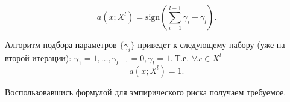 \begin{equation*}
	\displaystyle a(x; X^l) =  \text{sign} ( \sum\limits_{i=1}^{l-1} \gamma_i - \gamma_l).
\end{equation*}

 Алгоритм подбора параметров $\{\gamma_i\}$ приведет к следующему набору (уже на второй итерации): $\gamma_1=1, \dots, \gamma_{l-1}=0, \gamma_l=1$. Т.е. $\forall x \in X^l$ 
\begin{equation*}
	\displaystyle a(x; X^l) = 1.
\end{equation*}

Воспользовавшись формулой для эмпирического риска получаем требуемое.










